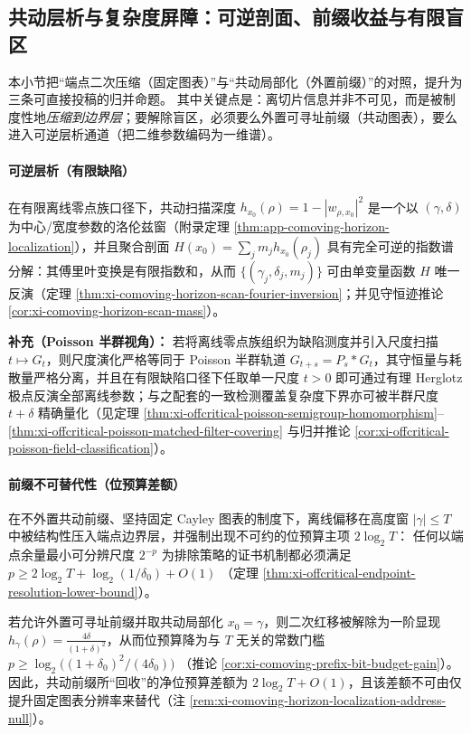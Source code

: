 \subsection{共动层析与复杂度屏障：可逆剖面、前缀收益与有限盲区}\label{subsec:discussion-comoving-tomography-prefix-budget-blindspot}
本小节把“端点二次压缩（固定图表）”与“共动局部化（外置前缀）”的对照，提升为三条可直接投稿的归并命题。
其中关键点是：离切片信息并非不可见，而是被制度性地\emph{压缩到边界层}；要解除盲区，必须要么外置可寻址前缀（共动图表），要么进入可逆层析通道（把二维参数编码为一维谱）。

\paragraph{可逆层析（有限缺陷）}
在有限离线零点族口径下，共动扫描深度
\(
h_{x_0}(\rho)=1-|w_{\rho,x_0}|^2
\)
是一个以 \((\gamma,\delta)\) 为中心/宽度参数的洛伦兹窗（附录定理 \ref{thm:app-comoving-horizon-localization}），并且聚合剖面
\(
H(x_0)=\sum_j m_j h_{x_0}(\rho_j)
\)
具有完全可逆的指数谱分解：其傅里叶变换是有限指数和，从而 \(\{(\gamma_j,\delta_j,m_j)\}\) 可由单变量函数 \(H\) 唯一反演（定理 \ref{thm:xi-comoving-horizon-scan-fourier-inversion}；并见守恒迹推论 \ref{cor:xi-comoving-horizon-scan-mass}）。
\par
\textbf{补充（Poisson 半群视角）：}
若将离线零点族组织为缺陷测度并引入尺度扫描 \(t\mapsto G_t\)，则尺度演化严格等同于 Poisson 半群轨道 \(G_{t+s}=P_s*G_t\)，其守恒量与耗散量严格分离，并且在有限缺陷口径下任取单一尺度 \(t>0\) 即可通过有理 Herglotz 极点反演全部离线参数；与之配套的一致检测覆盖复杂度下界亦可被半群尺度 \(t+\delta\) 精确量化（见定理 \ref{thm:xi-offcritical-poisson-semigroup-homomorphism}--\ref{thm:xi-offcritical-poisson-matched-filter-covering} 与归并推论 \ref{cor:xi-offcritical-poisson-field-classification}）。

\paragraph{前缀不可替代性（位预算差额）}
在不外置共动前缀、坚持固定 Cayley 图表的制度下，离线偏移在高度窗 \(|\gamma|\le T\) 中被结构性压入端点边界层，并强制出现不可约的位预算主项 \(2\log_2T\)：
任何以端点余量最小可分辨尺度 \(2^{-p}\) 为排除策略的证书机制都必须满足
\(
p\ge 2\log_2T+\log_2(1/\delta_0)+O(1)
\)
（定理 \ref{thm:xi-offcritical-endpoint-resolution-lower-bound}）。
\par
若允许外置可寻址前缀并取共动局部化 \(x_0=\gamma\)，则二次红移被解除为一阶显现 \(h_{\gamma}(\rho)=\frac{4\delta}{(1+\delta)^2}\)，从而位预算降为与 \(T\) 无关的常数门槛
\(
p\ge \log_2\!\bigl((1+\delta_0)^2/(4\delta_0)\bigr)
\)
（推论 \ref{cor:xi-comoving-prefix-bit-budget-gain}）。
因此，共动前缀所“回收”的净位预算差额为 \(2\log_2T+O(1)\)，且该差额不可由仅提升固定图表分辨率来替代（注 \ref{rem:xi-comoving-horizon-localization-address-null}）。

